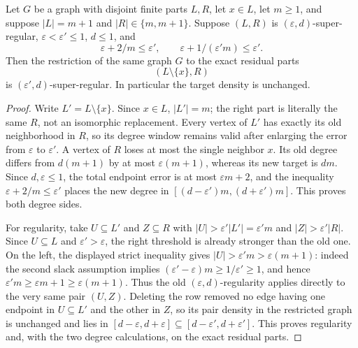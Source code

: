 \begin{lemma}
Let $G$ be a graph with disjoint finite parts $L,R$, let $x\in L$, let
$m\geq1$, and suppose $|L|=m+1$ and $|R|\in\{m,m+1\}$.  Suppose $(L,R)$
is $(\varepsilon,d)$-super-regular, $\varepsilon<\varepsilon'\leq1$,
$d\leq1$, and
\[
 \varepsilon+2/m\leq\varepsilon',\qquad
 \varepsilon+1/(\varepsilon'm)\leq\varepsilon'.
\]
Then the restriction of the same graph $G$ to the exact residual parts
\[
 (L\setminus\{x\},R)
\]
is $(\varepsilon',d)$-super-regular.  In particular the target density is unchanged.
\end{lemma}
\begin{proof}
Write $L'=L\setminus\{x\}$.  Since $x\in L$, $|L'|=m$; the right part is literally the same $R$, not an isomorphic replacement.  Every vertex of $L'$ has exactly its old neighborhood in $R$, so its degree window remains valid after enlarging the error from $\varepsilon$ to $\varepsilon'$.  A vertex of $R$ loses at most the single neighbor $x$.  Its old degree differs from $d(m+1)$ by at most $\varepsilon(m+1)$, whereas its new target is $dm$.  Since $d,\varepsilon\leq1$, the total endpoint error is at most $\varepsilon m+2$, and the inequality $\varepsilon+2/m\leq\varepsilon'$ places the new degree in $[(d-\varepsilon')m,(d+\varepsilon')m]$.  This proves both degree sides.

For regularity, take $U\subseteq L'$ and $Z\subseteq R$ with
$|U|>\varepsilon'|L'|=\varepsilon'm$ and $|Z|>\varepsilon'|R|$.  Since $U\subseteq L$ and $\varepsilon'>\varepsilon$, the right threshold is already stronger than the old one.  On the left, the displayed strict inequality gives $|U|>\varepsilon'm>\varepsilon(m+1)$: indeed the second slack assumption implies $(\varepsilon'-\varepsilon)m\geq1/\varepsilon'\geq1$, and hence $\varepsilon'm\geq\varepsilon m+1\geq\varepsilon(m+1)$.  Thus the old $(\varepsilon,d)$-regularity applies directly to the very same pair $(U,Z)$.  Deleting the row removed no edge having one endpoint in $U\subseteq L'$ and the other in $Z$, so its pair density in the restricted graph is unchanged and lies in $[d-\varepsilon,d+\varepsilon]\subseteq[d-\varepsilon',d+\varepsilon']$.  This proves regularity and, with the two degree calculations,  on the exact residual parts.
\end{proof}
